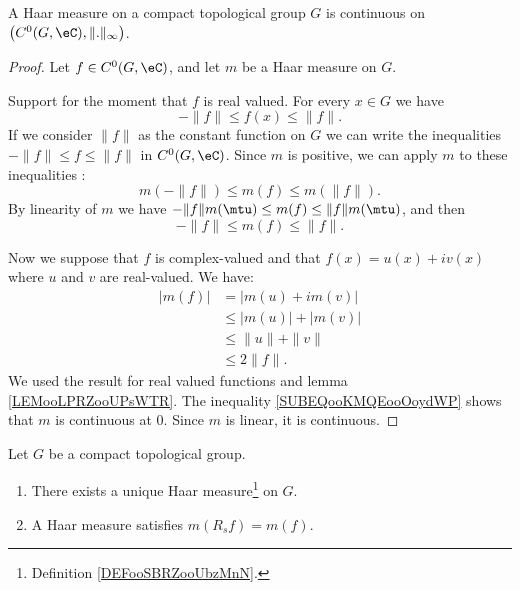 \begin{lemma}     \label{LEMooRWOFooDOSUYo}
    A Haar measure on a compact topological group \( G\) is continuous on \( \big( C^0(G,\eC), \| . \|_{\infty} \big)\).
\end{lemma}

\begin{proof}
    Let \( f\in C^0(G,\eC)\), and let \( m\) be a Haar measure on \( G\). 

    Support for the moment that \( f\) is real valued. For every \( x\in G\) we have
    \begin{equation}
        -\| f \|\leq f(x)\leq \| f \|.
    \end{equation}
    If we consider \( \| f \|\) as the constant function on \( G\) we can write the inequalities \( -\| f \|\leq f\leq \| f \|\) in \( C^0(G,\eC)\).  Since \( m\) is positive, we can apply \( m\) to these inequalities :
    \begin{equation}
        m(-\| f \|)\leq m(f)\leq m(\| f \|).
    \end{equation}
    By linearity of \( m\) we have $-\| f \|m(\mtu)\leq m(f)\leq \| f \|m(\mtu)$, and then
    \begin{equation}
        -\| f \|\leq m(f)\leq \| f \|.
    \end{equation}
    
    Now we suppose that \( f\) is complex-valued and that \( f(x)=u(x)+iv(x)\) where \( u\) and \( v\) are real-valued. We have:
    \begin{subequations}        \label{SUBEQooKMQEooOoydWP}
        \begin{align}
            | m(f) |&=| m(u)+im(v) |\\
            &\leq | m(u) |+| m(v) |\\
            &\leq \| u \|+\| v \|\\
            &\leq 2\| f \|.
        \end{align}
    \end{subequations}
    We used the result for real valued functions and lemma \ref{LEMooLPRZooUPsWTR}. The inequality \eqref{SUBEQooKMQEooOoydWP} shows that \( m\) is continuous at \( 0\). Since \( m\) is linear, it is continuous.
\end{proof}

\begin{theorem}       \label{THOooHZNRooLWmJMB}
    Let \( G\) be a compact topological group. 
    \begin{enumerate}
        \item
            There exists a unique Haar measure\footnote{Definition \ref{DEFooSBRZooUbzMnN}.} on \( G\).
        \item
            A Haar measure satisfies \( m(R_sf)=m(f)\).
    \end{enumerate}
\end{theorem}

